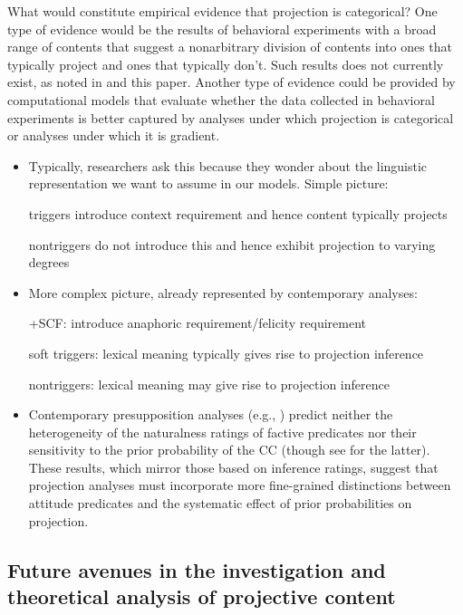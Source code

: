 \documentclass[11pt,fleqn]{article}
\newcommand{\6}{\mbox{$[\hspace*{-.6mm}[$}}
\newcommand{\9}{\mbox{$]\hspace*{-.6mm}]$}}
\begin{document}
What would constitute empirical evidence that projection is categorical? One type of evidence would be the results of behavioral experiments with a broad range of contents that suggest a nonarbitrary division of contents into ones that typically project and ones that typically don't. Such results does not currently exist, as noted in \citealt{degen-tonhauser-language} and this paper. Another type of evidence could be provided by computational models that evaluate whether the data collected in behavioral experiments is better captured by analyses under which projection is categorical or analyses under which it is gradient. 


\begin{itemize}

\item Typically, researchers ask this because they wonder about the linguistic representation we want to assume in our models. Simple picture:

triggers introduce context requirement and hence content typically projects

nontriggers do not introduce this and hence exhibit projection to varying degrees

\item More complex picture, already represented by contemporary analyses:

+SCF: introduce anaphoric requirement/felicity requirement

soft triggers: lexical meaning typically gives rise to projection inference

nontriggers: lexical meaning may give rise to projection inference



\item Contemporary presupposition analyses (e.g., \citealt{heim83,vds92,abrusan2011,karttunen2016,simons-etal2017}) predict neither the heterogeneity of the naturalness ratings of factive predicates nor their sensitivity to the prior probability of the CC (though see \citealt{schlenker2021} for the latter). These results, which mirror those based on inference ratings, suggest that projection analyses must incorporate more fine-grained distinctions between attitude predicates and the systematic effect of prior probabilities on projection.

\end{itemize}

\subsection{Future avenues in the investigation and theoretical analysis of projective content}\label{s:disc3}
\end{document}
